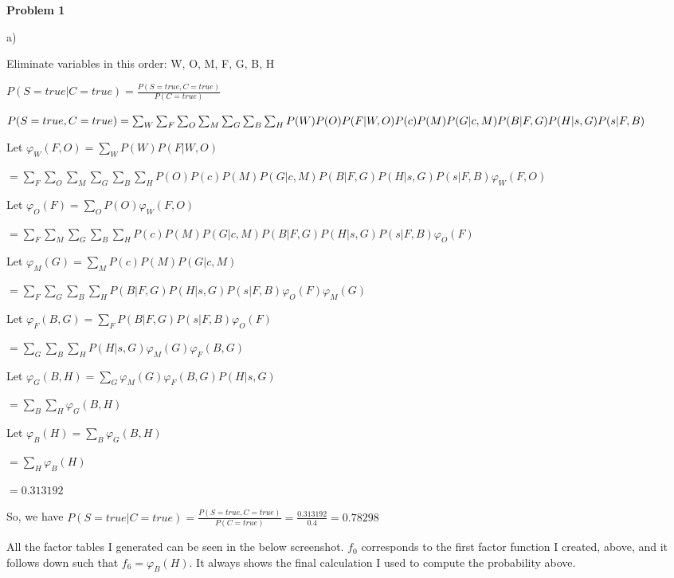 \documentclass[12pt]{article}
\begin{document}
\noindent

\textbf{Problem 1}

a) 

Eliminate variables in this order: W, O, M, F, G, B, H

$P(S = true \vert C = true) = \frac{P(S = true, C = true)}{P(C = true)}$

$P(S = true, C = true) = \sum_W\sum_F\sum_O\sum_M\sum_G\sum_B\sum_H P(W)P(O)P(F\vert W, O)P(c)P(M)P(G \vert c, M)\\P(B \vert F, G)P(H \vert s, G)P(s \vert F, B)$

Let $\varphi_W(F, O) = \sum_W P(W)P(F \vert W, O)$

$= \sum_F\sum_O\sum_M\sum_G\sum_B\sum_H P(O)P(c)P(M)P(G \vert c, M)P(B \vert F, G)P(H \vert s, G)P(s \vert F, B)\varphi_W(F, O)$

Let $\varphi_O(F) = \sum_O P(O)\varphi_W(F, O)$

$= \sum_F\sum_M\sum_G\sum_B\sum_H P(c)P(M)P(G \vert c, M)P(B \vert F, G)P(H \vert s, G)P(s \vert F, B)\varphi_O(F)$

Let $\varphi_M(G) = \sum_M P(c)P(M)P(G \vert c, M)$

$= \sum_F\sum_G\sum_B\sum_H P(B \vert F, G)P(H \vert s, G)P(s \vert F, B)\varphi_O(F)\varphi_M(G)$

Let $\varphi_F(B, G) = \sum_F P(B \vert F, G)P(s \vert F, B)\varphi_O(F)$

$= \sum_G\sum_B\sum_H P(H \vert s, G)\varphi_M(G)\varphi_F(B, G)$

Let $\varphi_G(B, H) = \sum_G \varphi_M(G)\varphi_F(B, G)P(H \vert s, G)$

$= \sum_B\sum_H \varphi_G(B, H)$

Let $\varphi_B(H) = \sum_B \varphi_G(B, H)$

$= \sum_H \varphi_B(H)$

$= 0.313192$

So, we have $P(S = true \vert C = true) = \frac{P(S = true, C = true)}{P(C = true)} = \frac{0.313192}{0.4} = \mathbf{0.78298}$

All the factor tables I generated can be seen in the below screenshot. $f_0$ corresponds to the first factor function I created, above, and it follows down such that $f_6 = \varphi_B(H)$. It always shows the final calculation I used to compute the probability above.
\end{document}
